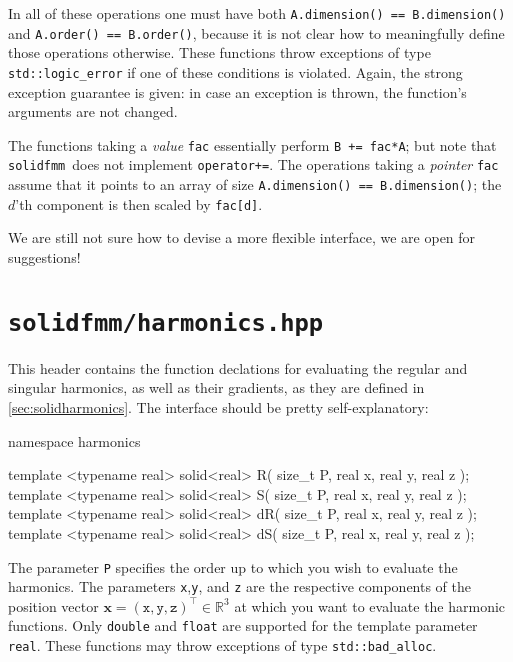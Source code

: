 \documentclass{scrbook}
\newcommand{\solidfmm}{\texttt{solidfmm}}
\newcommand{\reals}{\ensuremath{\mathbb{R}}}
\newcommand{\wholespace}{\ensuremath{\reals^3}}
\newcommand{\vv}[1]{\ensuremath{\symbf{#1}}} %
\begin{document}
In all of these operations one must have both
\lstinline|A.dimension() == B.dimension()| and
\lstinline|A.order() == B.order()|, because it is not clear how to meaningfully
define those operations otherwise. These functions throw exceptions of type
\lstinline|std::logic_error| if one of these conditions is violated. Again, the
strong exception guarantee is given: in case an exception is thrown, the
function's arguments are not changed.

The functions taking a \emph{value} \lstinline|fac| essentially perform
\lstinline|B += fac*A|; but note that \solidfmm\ does not implement
\lstinline|operator+=|. The operations taking a \emph{pointer} \lstinline|fac|
assume that it points to an array of size
\lstinline|A.dimension() == B.dimension()|; the $d$'th component is then scaled
by \lstinline|fac[d]|.

We are still not sure how to devise a more flexible interface, we are open
for suggestions!


\section{\texttt{solidfmm/harmonics.hpp}}\label{sec:harmonicshpp}
This header contains the function declations for evaluating the regular and
singular harmonics, as well as their gradients, as they are defined in
\cref{sec:solidharmonics}. The interface should be pretty self-explanatory:
\begin{cppcode*}
namespace harmonics
{

template <typename real> solid<real>  R( size_t P, real x, real y, real z );
template <typename real> solid<real>  S( size_t P, real x, real y, real z );
template <typename real> solid<real> dR( size_t P, real x, real y, real z );
template <typename real> solid<real> dS( size_t P, real x, real y, real z );

}
\end{cppcode*}

The parameter \lstinline|P| specifies the order up to which you wish to evaluate
the harmonics. The parameters \lstinline|x|,\lstinline|y|, and \lstinline|z| are
the respective components of the position vector $\vv{x}=(\mathtt{x},\mathtt{y},
\mathtt{z})^\top\in\wholespace$ at which you want to evaluate the harmonic
functions. Only \lstinline[style=cpp]|double| and \lstinline[style=cpp]|float|
are supported for the template parameter \lstinline|real|. These functions may
throw exceptions of type \lstinline|std::bad_alloc|.
\end{document}
